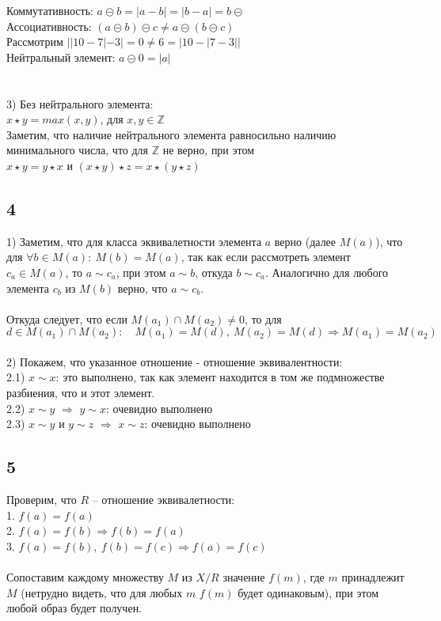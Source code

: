 		Коммутативность: $a \circleddash b = |a - b| = |b - a| = b \circleddash$\\
		Ассоциативность: $(a \circleddash b) \circleddash c \ne a \circleddash (b \circleddash c)$\\
		Рассмотрим $||10 - 7| - 3| = 0 \ne 6 = |10 - |7 - 3||$ \\
		Нейтральный элемент: $a \circleddash 0 = |a|$\\ 
		\\ \\
		3) Без нейтрального элемента: \\
		$x  \star  y = max(x, y)$, для $x, y \in \mathbb{Z}$\\
		Заметим, что наличие нейтрального элемента равносильно наличию минимального числа, что для $\mathbb{Z}$ не верно, при этом \\
		$x \star y = y \star x$ и $(x \star y) \star z = x \star (y \star z)$
		
		\subsection{4}
		1) Заметим, что для класса эквивалетности элемента $a$ верно (далее $M(a)$), что для $\forall b \in M(a): \ M(b) = M(a)$, так как если рассмотреть элемент $c_a \in M(a)$, то $a \sim c_a$, при этом $a \sim b$, откуда $b \sim c_a$. Аналогично для любого элемента $c_b$ из $M(b)$ верно, что $a \sim c_b$.\\
		\\
		Откуда следует, что если $M(a_1) \cap M(a_2) \ne 0$, то для $d \in M(a_1) \cap M(a_2): \quad M(a_1) = M(d),\ M(a_2) = M(d) \Longrightarrow M(a_1) = M(a_2)$\\
		\\
		2) Покажем, что указанное отношение - отношение эквивалентности:\\
		2.1) $x \sim x$: это выполнено, так как элемент находится в том же подмножестве разбиения, что и этот элемент.\\
		2.2) $x \sim y$ $\Longrightarrow$ $y \sim x$: очевидно выполнено\\
		2.3) $x \sim y$ и $y \sim z$ $\Longrightarrow$ $x \sim z$: очевидно выполнено\\
		
		\subsection{5}
		Проверим, что $R$ -- отношение эквивалетности:\\
		1. $f(a) = f(a)$\\
		2. $f(a) = f(b) \Longrightarrow f(b) = f(a)$\\
		3. $f(a) = f(b),\ f(b) = f(c) \Longrightarrow f(a) = f(c)$\\
		\\
		Сопоставим каждому множеству $M$ из $X/R$ значение $f(m)$, где $m$ принадлежит $M$ (нетрудно видеть, что для любых $m$ $f(m)$ будет одинаковым), при этом любой образ будет получен.
		
